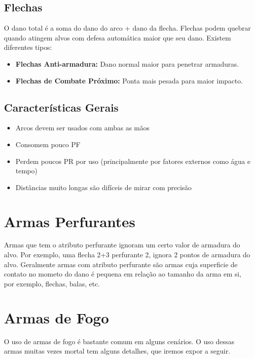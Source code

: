 \subsection{Flechas}

O dano total é a soma do dano do arco + dano da flecha. Flechas podem quebrar quando atingem alvos com defesa automática maior que seu dano. Existem diferentes tipos:

\begin{itemize}
	\item \textbf{Flechas Anti-armadura:} Dano normal maior para penetrar armaduras.
	\item \textbf{Flechas de Combate Próximo:} Ponta mais pesada para maior impacto.
\end{itemize}

\subsection{Características Gerais}

\begin{itemize}
	\item Arcos devem ser usados com ambas as mãos
	\item Consomem pouco PF
	\item Perdem poucos PR por uso (principalmente por fatores externos como água e tempo)
	\item Distâncias muito longas são difíceis de mirar com precisão
\end{itemize}

\section{Armas Perfurantes}

Armas que tem o atributo perfurante ignoram um certo valor de armadura do alvo. Por exemplo, uma flecha 2+3 perfurante 2, ignora 2 pontos de armadura do alvo. 
Geralmente armas com atributo perfurante são armas cuja superficie de contato no mometo do dano é pequena em relação ao tamanho da arma em si, por exemplo, flechas, balas, etc.

\section{Armas de Fogo}

O uso de armas de fogo é bastante comum em alguns cenários. O uso dessas armas muitas vezes mortal tem alguns detalhes, que iremos expor a seguir.


